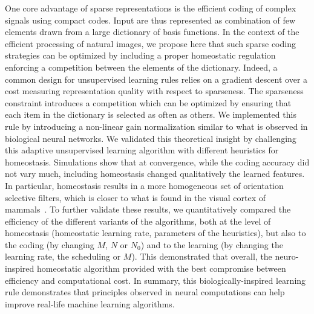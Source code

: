 \documentclass[draft]{article} %
\begin{document}
%
One core advantage of sparse representations is the efficient coding of complex signals using compact codes. Input are thus represented as combination of few elements drawn from a large dictionary of basis functions. In the context of the efficient processing of natural images, we propose here that such sparse coding strategies can be optimized by including a proper homeostatic regulation enforcing a competition between the elements of the dictionary. Indeed, a common design for unsupervised learning rules relies on a gradient descent over a cost measuring representation quality with respect to sparseness. The sparseness constraint introduces a competition which can be optimized by ensuring that each item in the dictionary is selected as often as others. We implemented this rule by introducing a non-linear gain normalization similar to what is observed in biological neural networks. We validated this theoretical insight by challenging this adaptive unsupervised learning algorithm with different heuristics for homeostasis. Simulations show that at convergence, while the coding accuracy did not vary much, including homeostasis changed qualitatively the learned features. In particular, homeostasis results in a more homogeneous set of orientation selective filters, which is closer to what is found in the visual cortex of mammals~\citep{Ringach02,Rehn07,Loxley17}. To further validate these results, we quantitatively compared the efficiency of the different variants of the algorithms, both at the level of homeostasis (homeostatic learning rate, parameters of the heuristics), but also to the coding (by changing $M$, $N$ or $N_0$) and to the learning (by changing the learning rate, the scheduling or $M$). This demonstrated that overall, the neuro-inspired homeostatic algorithm provided with the best compromise between efficiency and computational cost. In summary, this biologically-inspired learning rule demonstrates that principles observed in neural computations can help improve real-life machine learning algorithms.
\end{document}
